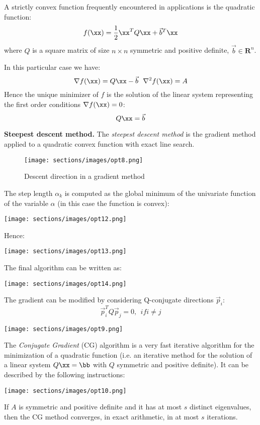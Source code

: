 A strictly convex function frequently encountered in applications is the quadratic function:
$$f(\xx)=\frac{1}{2} \xx^T Q \xx + \vec{b} ^T \xx$$
where $Q$ is a square matrix of size $n \times n$ symmetric and positive definite, $\vec{b}  \in \mathbf{R}^n$.

In this particular case we have:
$$\nabla f(\xx)=Q \xx- \vec{b} \ \ \nabla^2 f(\xx)=A$$
Hence the unique minimizer of $f$ is the solution of the linear system representing the first order conditions $\nabla f(\xx)=0$:
$$Q \xx= \vec{b}$$

\textbf{Steepest descent method.} The \textit{steepest descent method} is the gradient method applied to a quadratic convex function with exact line search.

\begin{figure}
\texttt{[image: sections/images/opt8.png]}
\caption{Descent direction in a gradient method}
\label{fig:2}\end{figure}

The step length $\alpha_k$ is computed as the global minimum of the univariate function of the variable $\alpha$ (in this case the function is convex):

\texttt{[image: sections/images/opt12.png]}

Hence:

\texttt{[image: sections/images/opt13.png]}

 The final algorithm can be written as:
 
\texttt{[image: sections/images/opt14.png]}


The gradient can be modified by considering Q-conjugate directions $\vec{p}_i$:
$$\vec{p}_i^T Q \vec{p}_j=0, \ \ if i \neq j$$

\texttt{[image: sections/images/opt9.png]}
   
The \textit{Conjugate Gradient }  (CG) algorithm is a very fast iterative algorithm for the minimization of a quadratic function (i.e. an iterative method for the solution of a linear system $Q\xx=\bb$ with $Q$ symmetric and positive definite).
It can be described by the following instructions:

\texttt{[image: sections/images/opt10.png]}

\begin{proposition}
If $A$ is symmetric and positive definite and it has at most $s$ distinct eigenvalues, then the CG method converges, in exact arithmetic, in at most $s$ iterations.
\end{proposition}

